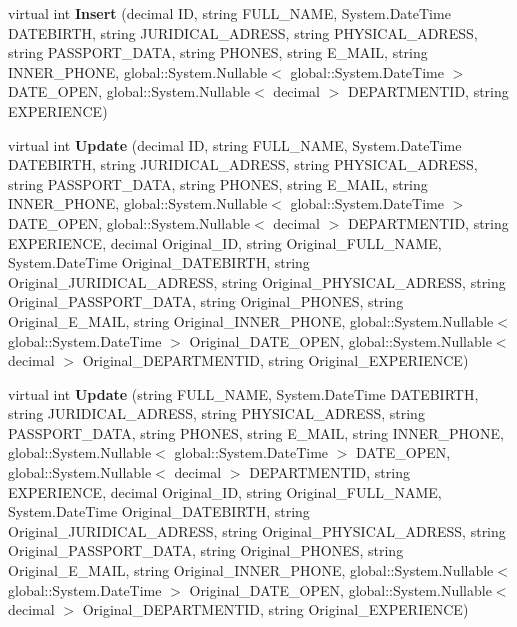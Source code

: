 \begin{CompactItemize}
\item 
virtual int \textbf{Insert} (decimal ID, string FULL\_\-NAME, System.DateTime DATEBIRTH, string JURIDICAL\_\-ADRESS, string PHYSICAL\_\-ADRESS, string PASSPORT\_\-DATA, string PHONES, string E\_\-MAIL, string INNER\_\-PHONE, global::System.Nullable$<$ global::System.DateTime $>$ DATE\_\-OPEN, global::System.Nullable$<$ decimal $>$ DEPARTMENTID, string EXPERIENCE)\label{class_automatic_medical_system_1_1_data_set1_table_adapters_1_1_d_o_c_t_o_r_s_table_adapter_8c1637161bbf34ee49bc2ea50ad164b5}

\item 
virtual int \textbf{Update} (decimal ID, string FULL\_\-NAME, System.DateTime DATEBIRTH, string JURIDICAL\_\-ADRESS, string PHYSICAL\_\-ADRESS, string PASSPORT\_\-DATA, string PHONES, string E\_\-MAIL, string INNER\_\-PHONE, global::System.Nullable$<$ global::System.DateTime $>$ DATE\_\-OPEN, global::System.Nullable$<$ decimal $>$ DEPARTMENTID, string EXPERIENCE, decimal Original\_\-ID, string Original\_\-FULL\_\-NAME, System.DateTime Original\_\-DATEBIRTH, string Original\_\-JURIDICAL\_\-ADRESS, string Original\_\-PHYSICAL\_\-ADRESS, string Original\_\-PASSPORT\_\-DATA, string Original\_\-PHONES, string Original\_\-E\_\-MAIL, string Original\_\-INNER\_\-PHONE, global::System.Nullable$<$ global::System.DateTime $>$ Original\_\-DATE\_\-OPEN, global::System.Nullable$<$ decimal $>$ Original\_\-DEPARTMENTID, string Original\_\-EXPERIENCE)\label{class_automatic_medical_system_1_1_data_set1_table_adapters_1_1_d_o_c_t_o_r_s_table_adapter_d652ecaa5a16691dcc976ad520d0b9ae}

\item 
virtual int \textbf{Update} (string FULL\_\-NAME, System.DateTime DATEBIRTH, string JURIDICAL\_\-ADRESS, string PHYSICAL\_\-ADRESS, string PASSPORT\_\-DATA, string PHONES, string E\_\-MAIL, string INNER\_\-PHONE, global::System.Nullable$<$ global::System.DateTime $>$ DATE\_\-OPEN, global::System.Nullable$<$ decimal $>$ DEPARTMENTID, string EXPERIENCE, decimal Original\_\-ID, string Original\_\-FULL\_\-NAME, System.DateTime Original\_\-DATEBIRTH, string Original\_\-JURIDICAL\_\-ADRESS, string Original\_\-PHYSICAL\_\-ADRESS, string Original\_\-PASSPORT\_\-DATA, string Original\_\-PHONES, string Original\_\-E\_\-MAIL, string Original\_\-INNER\_\-PHONE, global::System.Nullable$<$ global::System.DateTime $>$ Original\_\-DATE\_\-OPEN, global::System.Nullable$<$ decimal $>$ Original\_\-DEPARTMENTID, string Original\_\-EXPERIENCE)\label{class_automatic_medical_system_1_1_data_set1_table_adapters_1_1_d_o_c_t_o_r_s_table_adapter_d3319a37e9d3744e6cd9acb5b946952d}

\end{CompactItemize}
